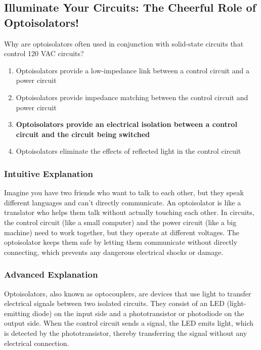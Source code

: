 \subsection{Illuminate Your Circuits: The Cheerful Role of Optoisolators!}

\begin{tcolorbox}[colback=gray!10!white,colframe=black!75!black,title=E6F08] Why are optoisolators often used in conjunction with solid-state circuits that control 120 VAC circuits?
    \begin{enumerate}[label=\Alph*,noitemsep]
        \item Optoisolators provide a low-impedance link between a control circuit and a power circuit
        \item Optoisolators provide impedance matching between the control circuit and power circuit
        \item \textbf{Optoisolators provide an electrical isolation between a control circuit and the circuit being switched}
        \item Optoisolators eliminate the effects of reflected light in the control circuit
    \end{enumerate}
\end{tcolorbox}

\subsubsection{Intuitive Explanation}
Imagine you have two friends who want to talk to each other, but they speak different languages and can't directly communicate. An optoisolator is like a translator who helps them talk without actually touching each other. In circuits, the control circuit (like a small computer) and the power circuit (like a big machine) need to work together, but they operate at different voltages. The optoisolator keeps them safe by letting them communicate without directly connecting, which prevents any dangerous electrical shocks or damage.

\subsubsection{Advanced Explanation}
Optoisolators, also known as optocouplers, are devices that use light to transfer electrical signals between two isolated circuits. They consist of an LED (light-emitting diode) on the input side and a phototransistor or photodiode on the output side. When the control circuit sends a signal, the LED emits light, which is detected by the phototransistor, thereby transferring the signal without any electrical connection.

